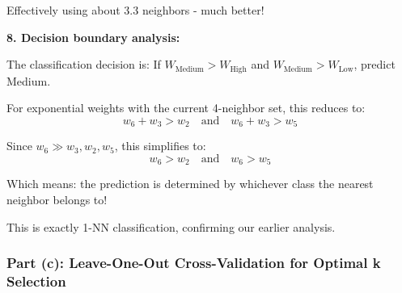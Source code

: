 \documentclass[12pt]{article}
\begin{document}
\begin{computation}
Effectively using about 3.3 neighbors - much better!

\textbf{8. Decision boundary analysis:}

The classification decision is: If \(W_{\text{Medium}} > W_{\text{High}}\) and \(W_{\text{Medium}} > W_{\text{Low}}\), predict Medium.

For exponential weights with the current 4-neighbor set, this reduces to:
\[
w_6 + w_3 > w_2 \quad \text{and} \quad w_6 + w_3 > w_5
\]

Since \(w_6 \gg w_3, w_2, w_5\), this simplifies to:
\[
w_6 > w_2 \quad \text{and} \quad w_6 > w_5
\]

Which means: the prediction is determined by whichever class the nearest neighbor belongs to!

This is exactly 1-NN classification, confirming our earlier analysis.
\end{computation}

\newpage
\subsubsection{Part (c): Leave-One-Out Cross-Validation for Optimal k Selection}
\end{document}
